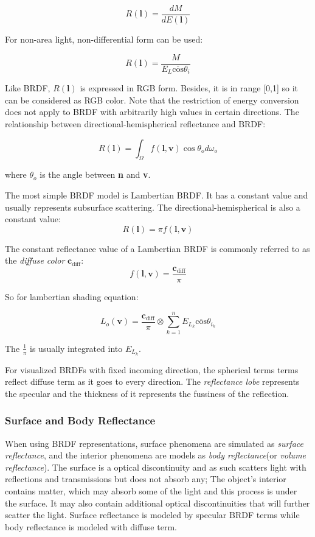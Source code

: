 \documentclass[10pt, a4paper]{article}
\begin{document}
            $$R(\textbf{l}) = \frac{dM}{dE(\textbf{l})}$$

            For non-area light, non-differential form can be used:

            $$R(\textbf{l}) = \frac{M}{E_L\overline{\text{cos}}\theta_i}$$

            Like BRDF, $R(\textbf{l})$ is expressed in RGB form. Besides, it is in range [0,1] so it can be considered as RGB color. Note that the restriction of energy conversion does not apply to BRDF with arbitrarily high values in certain directions. The relationship between directional-hemispherical reflectance and BRDF: 

            $$R(\textbf{l}) = \int_{\Omega}f(\textbf{l}, \textbf{v})\cos{\theta_o}d\omega_o$$

            where $\theta_o$ is the angle between \textbf{n} and \textbf{v}.

            The most simple BRDF model is Lambertian BRDF. It has a constant value and usually represents subsurface scattering. The directional-hemispherical is also a constant value:
            $$R(\textbf{l}) = \pi f(\textbf{l}, \textbf{v})$$
            
            The constant reflectance value of a Lambertian BRDF is commonly referred to as the \emph{diffuse color} $\textbf{c}_{\text{diff}}$: 
            $$f(\textbf{l}, \textbf{v}) = \frac{\textbf{c}_{\text{diff}}}{\pi}$$
            
            So for lambertian shading equation: 

            $$L_o(\textbf{v}) = \frac{\textbf{c}_{\text{diff}}}{\pi} \otimes \sum_{k = 1}^{n} E_{L_k}\overline{\text{cos}}\theta_{i_k}$$

            The $\frac{1}{\pi}$ is usually integrated into $E_{L_k}$.

            For visualized BRDFs with fixed incoming direction, the spherical terms terms reflect diffuse term as it goes to every direction. The \emph{reflectance lobe} represents the specular and the thickness of it represents the fussiness of the reflection. 

        \subsubsection{Surface and Body Reflectance}
            When using BRDF representations, surface phenomena are simulated as \emph{surface reflectance}, and the interior phenomena are models as \emph{body reflectance}(or \emph{volume reflectance}). The surface is a optical discontinuity and as such scatters light with reflections and transmissions but does not absorb any; The object's interior contains matter, which may absorb some of the light and this process is under the surface. It may also contain additional optical discontinuities that will further scatter the light. Surface reflectance is modeled by specular BRDF terms while body reflectance is modeled with diffuse term. 
\end{document}
